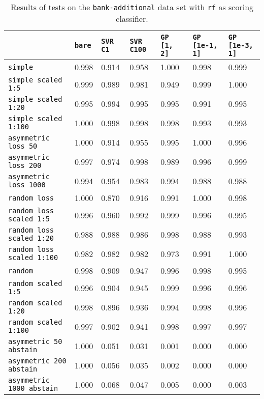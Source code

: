 \begin{table}[H]
{\scriptsize
\begin{tabu}{l|l|l|l|l|l|l}
&\texttt{bare} &\texttt{SVR C1} &\texttt{SVR C100} &\texttt{GP [1, 2]} &\texttt{GP [1e-1, 1]} &\texttt{GP [1e-3, 1]}  \\
\hline
\texttt{simple} &0.998 &0.914 &0.958 &1.000 &0.998 &0.999 \\
\texttt{simple scaled 1:5} &0.999 &0.989 &0.981 &0.949 &0.999 &1.000 \\
\texttt{simple scaled 1:20} &0.995 &0.994 &0.995 &0.995 &0.991 &0.995 \\
\texttt{simple scaled 1:100} &1.000 &0.998 &0.998 &0.998 &0.993 &0.993 \\
\texttt{asymmetric loss 50} &1.000 &0.914 &0.955 &0.995 &1.000 &0.996 \\
\texttt{asymmetric loss 200} &0.997 &0.974 &0.998 &0.989 &0.996 &0.999 \\
\texttt{asymmetric loss 1000} &0.994 &0.954 &0.983 &0.994 &0.988 &0.988 \\
\texttt{random loss} &1.000 &0.870 &0.916 &0.991 &1.000 &0.998 \\
\texttt{random loss scaled 1:5} &0.996 &0.960 &0.992 &0.999 &0.996 &0.995 \\
\texttt{random loss scaled 1:20} &0.988 &0.988 &0.986 &0.998 &0.988 &0.993 \\
\texttt{random loss scaled 1:100} &0.982 &0.982 &0.982 &0.973 &0.991 &1.000 \\
\texttt{random} &0.998 &0.909 &0.947 &0.996 &0.998 &0.995 \\
\texttt{random scaled 1:5} &0.996 &0.904 &0.945 &0.999 &0.996 &0.996 \\
\texttt{random scaled 1:20} &0.998 &0.896 &0.936 &0.994 &0.998 &0.996 \\
\texttt{random scaled 1:100} &0.997 &0.902 &0.941 &0.998 &0.997 &0.997 \\
\texttt{asymmetric 50 abstain} &1.000 &0.051 &0.031 &0.001 &0.000 &0.000 \\
\texttt{asymmetric 200 abstain} &1.000 &0.056 &0.035 &0.002 &0.000 &0.000 \\
\texttt{asymmetric 1000 abstain} &1.000 &0.068 &0.047 &0.005 &0.000 &0.003 \\
\end{tabu} }
\caption{Results of tests on the \texttt{bank-additional} data set
         with \texttt{rf} as scoring classifier.}
\end{table}

